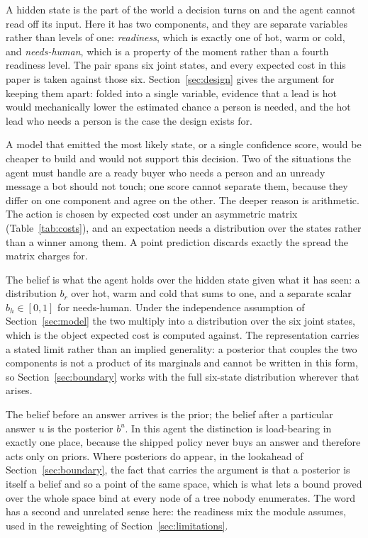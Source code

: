 \documentclass{article}
\begin{document}
A hidden state is the part of the world a decision turns on and the agent cannot read
off its input. Here it has two components, and they are separate variables rather
than levels of one: \emph{readiness}, which is exactly one of hot, warm or cold, and
\emph{needs-human}, which is a property of the moment rather than a fourth readiness
level. The pair spans six joint states, and every expected cost in this paper is
taken against those six. Section~\ref{sec:design} gives the argument for keeping them
apart: folded into a single variable, evidence that a lead is hot would mechanically
lower the estimated chance a person is needed, and the hot lead who needs a person is
the case the design exists for.

A model that emitted the most likely state, or a single confidence score, would be
cheaper to build and would not support this decision. Two of the situations the agent
must handle are a ready buyer who needs a person and an unready message a bot should
not touch; one score cannot separate them, because they differ on one component and
agree on the other. The deeper reason is arithmetic. The action is chosen by expected
cost under an asymmetric matrix (Table~\ref{tab:costs}), and an expectation needs a
distribution over the states rather than a winner among them. A point prediction
discards exactly the spread the matrix charges for.

The belief is what the agent holds over the hidden state given what it has seen: a
distribution $b_r$ over hot, warm and cold that sums to one, and a separate scalar
$b_h \in [0,1]$ for needs-human. Under the independence assumption of
Section~\ref{sec:model} the two multiply into a distribution over the six joint
states, which is the object expected cost is computed against. The representation
carries a stated limit rather than an implied generality: a posterior that couples the
two components is not a product of its marginals and cannot be written in this form,
so Section~\ref{sec:boundary} works with the full six-state distribution wherever that
arises.

The belief before an answer arrives is the prior; the belief after a particular answer
$u$ is the posterior $b^u$. In this agent the distinction is load-bearing in exactly
one place, because the shipped policy never buys an answer and therefore acts only on
priors. Where posteriors do appear, in the lookahead of Section~\ref{sec:boundary},
the fact that carries the argument is that a posterior is itself a belief and so a
point of the same space, which is what lets a bound proved over the whole space bind
at every node of a tree nobody enumerates. The word has a second and unrelated sense
here: the readiness mix the module assumes, used in the reweighting of
Section~\ref{sec:limitations}.
\end{document}
